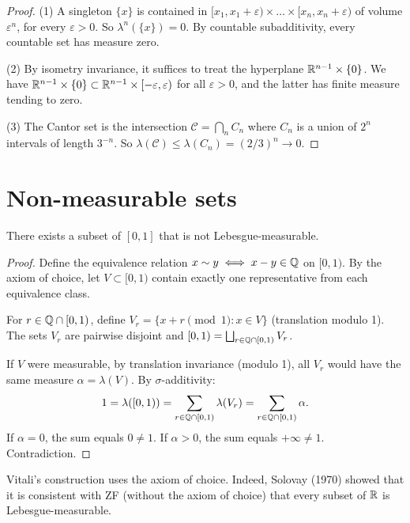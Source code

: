 \begin{proof}
(1) A singleton $\{x\}$ is contained in $[x_1, x_1 + \varepsilon) \times \ldots
\times [x_n, x_n + \varepsilon)$ of volume $\varepsilon^n$, for every
$\varepsilon > 0$. So $\lambda^n(\{x\}) = 0$. By countable subadditivity, every
countable set has measure zero.

(2) By isometry invariance, it suffices to treat the hyperplane
$\mathbb{R}^{n-1} \times \{0\}$. We have $\mathbb{R}^{n-1} \times \{0\} \subset \mathbb{R}^{n-1} \times
[-\varepsilon, \varepsilon)$ for all $\varepsilon > 0$, and the latter has finite
measure tending to zero.

(3) The Cantor set is the intersection $\mathcal{C} = \bigcap_n C_n$ where $C_n$ is
a union of $2^n$ intervals of length $3^{-n}$. So
$\lambda(\mathcal{C}) \leq \lambda(C_n) = (2/3)^n \to 0$.
\end{proof}

\section{Non-measurable sets}

\begin{theorem}[Vitali, 1905]
\label{thm:vitali}
There exists a subset of $[0,1]$ that is not Lebesgue-measurable.
\end{theorem}

\begin{proof}
Define the equivalence relation $x \sim y \iff x - y \in \mathbb{Q}$ on $[0,1)$. By the
axiom of choice, let $V \subset [0,1)$ contain exactly one representative from each
equivalence class.

For $r \in \mathbb{Q} \cap [0,1)$, define $V_r = \{x + r \pmod{1} : x \in V\}$ (translation
modulo 1). The sets $V_r$ are pairwise disjoint and
$[0,1) = \bigsqcup_{r \in \mathbb{Q} \cap [0,1)} V_r$.

If $V$ were measurable, by translation invariance (modulo 1), all $V_r$ would have
the same measure $\alpha = \lambda(V)$. By $\sigma$-additivity:
\[
1 = \lambda([0,1)) = \sum_{r \in \mathbb{Q} \cap [0,1)} \lambda(V_r) =
\sum_{r \in \mathbb{Q} \cap [0,1)} \alpha.
\]
If $\alpha = 0$, the sum equals $0 \neq 1$. If $\alpha > 0$, the sum equals
$+\infty \neq 1$. Contradiction.
\end{proof}

\begin{warning}[title=\textbf{Role of the axiom of choice}]
Vitali's construction uses the axiom of choice. Indeed, Solovay (1970) showed that
it is consistent with ZF (without the axiom of choice) that every subset of $\mathbb{R}$
is Lebesgue-measurable.
\end{warning}

